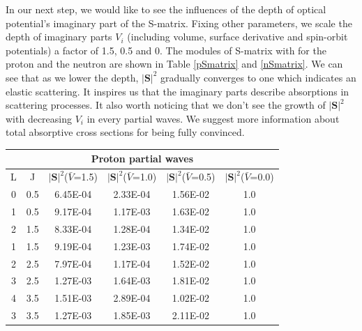 \documentclass[12pt]{article}
\begin{document}
	In our next step, we would like to see the influences of the depth of optical potential's imaginary part of the S-matrix. Fixing other parameters, we scale the depth of imaginary parts $V_i$ (including volume, surface derivative and spin-orbit potentials) a factor of 1.5, 0.5 and 0. The modules of S-matrix with for the proton and the neutron are shown in Table \ref{pSmatrix} and \ref{nSmatrix}. We can see that as we lower the depth, $|\mathbf{S}|^2$ gradually converges to one which indicates an elastic scattering. It inspires us that the imaginary parts describe absorptions in scattering processes. It also worth noticing that we don't see the growth of $|\mathbf{S}|^2$ with decreasing $V_i$ in every partial waves. We suggest more information about total absorptive cross sections for being fully convinced.

	\begin{table}[]
\centering
\begin{tabular}{cccccc}
\toprule
\multicolumn{6}{c}{Proton partial waves}                                                                         \\
 \midrule
L                     & J                     & $|\mathbf{S}|^2$($\bar{V}$=1.5) & $|\mathbf{S}|^2$($\bar{V}$=1.0) & $|\mathbf{S}|^2$($\bar{V}$=0.5) & $|\mathbf{S}|^2$($\bar{V}$=0.0) \\
0                     & 0.5                   & 6.45E-04                     & 2.33E-04                     & 1.56E-02                     & 1.0                          \\
1                     & 0.5                   & 9.17E-04                     & 1.17E-03                     & 1.63E-02                     & 1.0                          \\
2                     & 1.5                   & 8.33E-04                     & 1.28E-04                     & 1.34E-02                     & 1.0                          \\
1                     & 1.5                   & 9.19E-04                     & 1.23E-03                     & 1.74E-02                     & 1.0                          \\
2                     & 2.5                   & 7.97E-04                     & 1.17E-04                     & 1.52E-02                     & 1.0                          \\
3                     & 2.5                   & 1.27E-03                     & 1.64E-03                     & 1.81E-02                     & 1.0                          \\
4                     & 3.5                   & 1.51E-03                     & 2.89E-04                     & 1.02E-02                     & 1.0                          \\
3                     & 3.5                   & 1.27E-03                     & 1.85E-03                     & 2.11E-02     
	& 1.0                          \\
   

\end{tabular}
\end{table}
\end{document}
